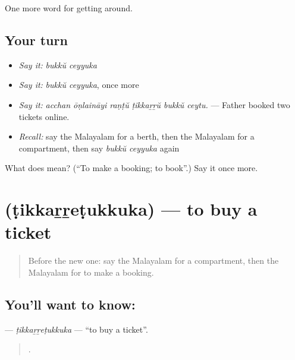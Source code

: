 \begin{grammarlens}[title={What you've built}]
One more word for getting around.
\end{grammarlens}

\subsection*{Your turn}
\begin{itemize}
\raggedright
  \item \emph{Say it:} \emph{bukkŭ ceyyuka}
  \item \emph{Say it:} \emph{bukkŭ ceyyuka}, once more
  \item \emph{Say it:} \emph{acchan ōṇlaināyi raṇṭŭ ṭikkaṟṟŭ bukkŭ ceytu.} — Father booked two tickets online.
  \item \emph{Recall:} say the Malayalam for a berth, then the Malayalam for a compartment, then say \emph{bukkŭ ceyyuka} again
\end{itemize}

\begin{tcolorbox}[breakable,colback=teal!4,colframe=teal!35!black,title={Before you move on}]
What does   mean? (\textquotedblleft{}To make a booking; to book\textquotedblright{}.) Say it once more.
\end{tcolorbox}
\section[\texorpdfstring{\ml{ടിക്കറ്റെടുക്കുക} (ṭikkaṟṟeṭukkuka)}{ടിക്കറ്റെടുക്കുക (ṭikkaṟṟeṭukkuka)}]{ (ṭikkaṟṟeṭukkuka) — to buy a ticket}

\label{lesson:ML-C462-tikkarretukkuka}



\begin{quote}
Before the new one: say the Malayalam for a compartment, then the Malayalam for to make a booking.
\end{quote}

\subsection*{You'll want to know: }
\textbf{} — \emph{ṭikkaṟṟeṭukkuka} — \textquotedblleft{}to buy a ticket\textquotedblright{}.

\begin{quote}
   .
\end{quote}

